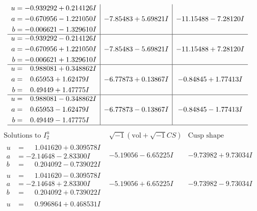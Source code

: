 \documentclass[1p]{elsarticle_modified}
\theoremstyle{definition}
\newcommand{\I}{\sqrt{-1}}
\begin{document}
$$\begin{array}{c|c|c}
\begin{aligned}
u &= -0.939292 + 0.214126 I \\
a &= -0.670956 - 1.221050 I \\
b &= -0.006621 - 1.329610 I\end{aligned}
 & -7.85483 + 5.69821 I & -11.15488 - 7.28120 I \\ \hline\begin{aligned}
u &= -0.939292 - 0.214126 I \\
a &= -0.670956 + 1.221050 I \\
b &= -0.006621 + 1.329610 I\end{aligned}
 & -7.85483 - 5.69821 I & -11.15488 + 7.28120 I \\ \hline\begin{aligned}
u &= \phantom{-}0.988081 + 0.348862 I \\
a &= \phantom{-}0.65953 + 1.62479 I \\
b &= \phantom{-}0.49449 + 1.47775 I\end{aligned}
 & -6.77873 + 0.13867 I & -0.84845 + 1.77413 I \\ \hline\begin{aligned}
u &= \phantom{-}0.988081 - 0.348862 I \\
a &= \phantom{-}0.65953 - 1.62479 I \\
b &= \phantom{-}0.49449 - 1.47775 I\end{aligned}
 & -6.77873 - 0.13867 I & -0.84845 - 1.77413 I\\
 \hline 
 \end{array}$$\newpage$$\begin{array}{c|c|c}  
\text{Solutions to }I^u_{2}& \I (\text{vol} + \sqrt{-1}CS) & \text{Cusp shape}\\
 \hline 
\begin{aligned}
u &= \phantom{-}1.041620 + 0.309578 I \\
a &= -2.14648 - 2.83300 I \\
b &= \phantom{-}0.204092 - 0.739022 I\end{aligned}
 & -5.19056 - 6.65225 I & -9.73982 + 9.73034 I \\ \hline\begin{aligned}
u &= \phantom{-}1.041620 - 0.309578 I \\
a &= -2.14648 + 2.83300 I \\
b &= \phantom{-}0.204092 + 0.739022 I\end{aligned}
 & -5.19056 + 6.65225 I & -9.73982 - 9.73034 I \\ \hline\begin{aligned}
u &= \phantom{-}0.996864 + 0.468531 I \\

\end{aligned}
\end{array}$$
\end{document}
